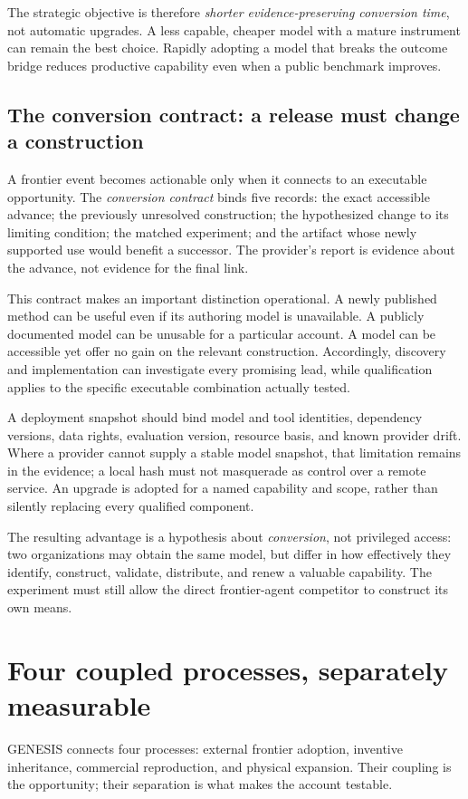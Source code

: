 \documentclass[11pt,letterpaper]{article}
\theoremstyle{remark}\newtheorem{remark}{Remark}[section]
\begin{document}
The strategic objective is therefore \emph{shorter evidence-preserving conversion time}, not automatic upgrades. A less capable, cheaper model with a mature instrument can remain the best choice. Rapidly adopting a model that breaks the outcome bridge reduces productive capability even when a public benchmark improves.


\subsection{The conversion contract: a release must change a construction}
A frontier event becomes actionable only when it connects to an executable opportunity. The \emph{conversion contract} binds five records: the exact accessible advance; the previously unresolved construction; the hypothesized change to its limiting condition; the matched experiment; and the artifact whose newly supported use would benefit a successor. The provider's report is evidence about the advance, not evidence for the final link.

This contract makes an important distinction operational. A newly published method can be useful even if its authoring model is unavailable. A publicly documented model can be unusable for a particular account. A model can be accessible yet offer no gain on the relevant construction. Accordingly, discovery and implementation can investigate every promising lead, while qualification applies to the specific executable combination actually tested.

A deployment snapshot should bind model and tool identities, dependency versions, data rights, evaluation version, resource basis, and known provider drift. Where a provider cannot supply a stable model snapshot, that limitation remains in the evidence; a local hash must not masquerade as control over a remote service. An upgrade is adopted for a named capability and scope, rather than silently replacing every qualified component.

The resulting advantage is a hypothesis about \emph{conversion}, not privileged access: two organizations may obtain the same model, but differ in how effectively they identify, construct, validate, distribute, and renew a valuable capability. The experiment must still allow the direct frontier-agent competitor to construct its own means.

\section{Four coupled processes, separately measurable}
\label{sec:loops}
GENESIS connects four processes: external frontier adoption, inventive inheritance, commercial reproduction, and physical expansion. Their coupling is the opportunity; their separation is what makes the account testable.
\end{document}
